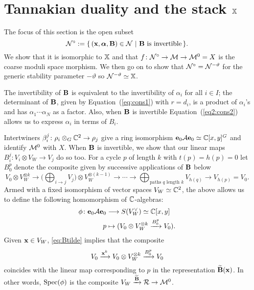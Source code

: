 \documentclass{amsart}
\newcommand{\balpha}{\boldsymbol{\alpha}}
\theoremstyle{definition}
\newcommand\VW{V_W}
\begin{document}

\section{Tannakian duality and the stack $\mathbb{X}$}

The focus of this section is the open subset $$\cN^\circ:= \{\,(\bfx, \balpha, \bfB) \in \cN \,\,|\,\, \bfB \text{ is invertible} \,\}.$$
We show that it is isomorphic to $\mathbb{X}$ and that $f \colon \mathcal{N}^\circ \rightarrow \mathcal{M} \rightarrow \mathcal{M}^0=X$ is the coarse moduli space morphism.
We then go on to show that $\mathcal{N}^\circ = \mathcal{N}^{-\vartheta}$ for the generic stability parameter $-\vartheta$ so $\mathcal{N}^{-\vartheta} \simeq \mathbb{X}$.

\begin{remark}
The invertibility of $\mathbf{B}$ is equivalent to the invertibility of $\alpha_i$ for all $i \in I$; the determinant of $\mathbf{B}$, given by Equation~(\ref{eq:cons1}) with $r=d_i$, is a product of $\alpha_i$'s and has $\alpha_1 \cdots \alpha_N$ as a factor.
Also, when $\mathbf{B}$ is invertible Equation~(\ref{eq2:cons2}) allows us to express $\alpha_i$ in terms of $B_i$.
\end{remark}

Intertwiners $\beta_i^j \colon \rho_i \otimes_G \mathbb{C}^2 \rightarrow \rho_j$ give a ring isomorphism $\mathbf{e}_0 \mathcal{A} \mathbf{e}_0 \simeq \mathbb{C}[x,y]^G$ and identify $\mathcal{M}^0$ with $X$.
When $\mathbf{B}$ is invertible, we show that our linear maps $B_i^j \colon V_i \otimes \VW \rightarrow V_j$ do so too.
For a cycle $p$ of length $k$ with $t(p)=h(p)=0$ let $B_0^p$ denote the composite given by successive applications of $\mathbf{B}$ below $$V_0 \otimes \VW^{\otimes k} \longrightarrow \Bigg(\bigoplus_{i \rightarrow j} V_j\Bigg) \otimes \VW^{\otimes (k-1)} \rightarrow \cdots \rightarrow \bigoplus_{\text{paths } q \text{ length } k} V_{h(q)} \rightarrow V_{h(p)}=V_0.$$
Armed with a fixed isomorphism of vector spaces $\VW \simeq \bC^2$, the above allows us to define the following homomorphism of $\mathbb{C}$-algebras:
\begin{align*}
\phi \colon \bfe_0 \cA \bfe_0 &\longrightarrow S(\VW^\vee) \simeq \bC[x,y]
\\ p &\mapsto (V_0 \otimes \VW^{\otimes k} \xrightarrow{B_0^p} V_0).
\end{align*}
Given $\bfx \in \VW$, \eqref{eq:Btilde} implies that the composite $$V_0 \xrightarrow{\bfx^k} V_0 \otimes \VW^{\otimes k} \xrightarrow{B_0^p} V_0$$ coincides with the linear map corresponding to $p$ in the representation $\widetilde{\mathbf{B}}(\mathbf{x})$.
In other words, $\operatorname{Spec}(\phi)$ is the composite $\VW \xrightarrow{\widetilde{\bfB}} \cR \rightarrow \cM^0$.
\end{document}
